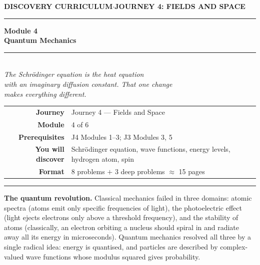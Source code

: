\documentclass[12pt,a4paper]{article}
\newcounter{problem}
\begin{document}
\thispagestyle{empty}
\begin{center}
{\small\color{MidBlue}\textbf{DISCOVERY CURRICULUM}\quad$\cdot$\quad\textbf{JOURNEY 4: FIELDS AND SPACE}}
\vspace{0.6cm}

{\color{NavyBlue}\rule{\linewidth}{2pt}}\vspace{0.5cm}

{\Huge\bfseries\color{NavyBlue}Module 4}\\[0.3cm]
{\LARGE\bfseries\color{MidBlue}Quantum Mechanics}\\[0.4cm]
{\color{Gold}\rule{0.4\linewidth}{1.2pt}}\\[0.4cm]
{\large\itshape\color{DarkGrey}
The Schr\"{o}dinger equation is the heat equation\\[0.15cm]
with an imaginary diffusion constant. That one change\\[0.15cm]
makes everything different.}

\vspace{1cm}
\begin{tabular}{rl}
\color{DarkGrey}\textbf{Journey}         & Journey 4 --- Fields and Space \\[4pt]
\color{DarkGrey}\textbf{Module}          & 4 of 6 \\[4pt]
\color{DarkGrey}\textbf{Prerequisites}   & J4 Modules 1--3; J3 Modules 3, 5 \\[4pt]
\color{DarkGrey}\textbf{You will discover} & Schr\"{o}dinger equation, wave functions, energy levels, hydrogen atom, spin \\[4pt]
\color{DarkGrey}\textbf{Format}          & 8 problems $+$ 3 deep problems $\approx$ 15 pages \\
\end{tabular}
\vspace{1cm}

{\color{NavyBlue}\rule{\linewidth}{2pt}}
\end{center}

\vspace{0.5cm}
\noindent\textbf{The quantum revolution.}
Classical mechanics failed in three domains: atomic spectra (atoms emit only specific frequencies of light), the photoelectric effect (light ejects electrons only above a threshold frequency), and the stability of atoms (classically, an electron orbiting a nucleus should spiral in and radiate away all its energy in microseconds). Quantum mechanics resolved all three by a single radical idea: energy is quantised, and particles are described by complex-valued wave functions whose modulus squared gives probability.
\end{document}
